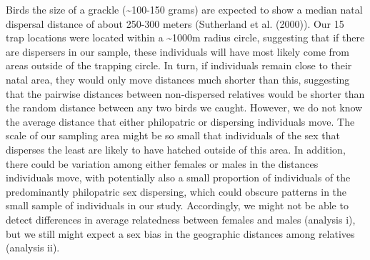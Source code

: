 \documentclass[]{article}
\begin{document}
Birds the size of a grackle (\textasciitilde{}100-150 grams) are
expected to show a median natal dispersal distance of about 250-300
meters (Sutherland et al. (2000)). Our 15 trap locations were located
within a \textasciitilde{}1000m radius circle, suggesting that if there
are dispersers in our sample, these individuals will have most likely
come from areas outside of the trapping circle. In turn, if individuals
remain close to their natal area, they would only move distances much
shorter than this, suggesting that the pairwise distances between
non-dispersed relatives would be shorter than the random distance
between any two birds we caught. However, we do not know the average
distance that either philopatric or dispersing individuals move. The
scale of our sampling area might be so small that individuals of the sex
that disperses the least are likely to have hatched outside of this
area. In addition, there could be variation among either females or
males in the distances individuals move, with potentially also a small
proportion of individuals of the predominantly philopatric sex
dispersing, which could obscure patterns in the small sample of
individuals in our study. Accordingly, we might not be able to detect
differences in average relatedness between females and males (analysis
i), but we still might expect a sex bias in the geographic distances
among relatives (analysis ii).
\end{document}
